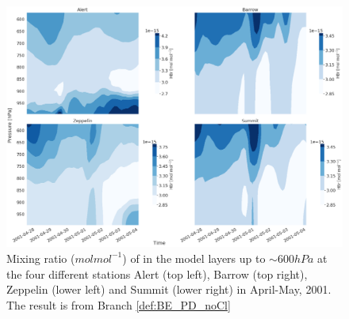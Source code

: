 \begin{figure}[ht]
    \centering
    \includegraphics[width = \linewidth]{Chapter6_Results/images/Vert_StationComp_2001/vertHBr_noCl.png}
    \caption{Mixing ratio ($mol mol^{-1}$) of  in the model layers up to $\sim 600 hPa$ at the four different stations Alert (top left), Barrow (top right), Zeppelin (lower left) and Summit (lower right) in April-May, 2001. The result is from Branch \ref{def:BE_PD_noCl}}
    \label{fig:vertHBr_noCl}
\end{figure}